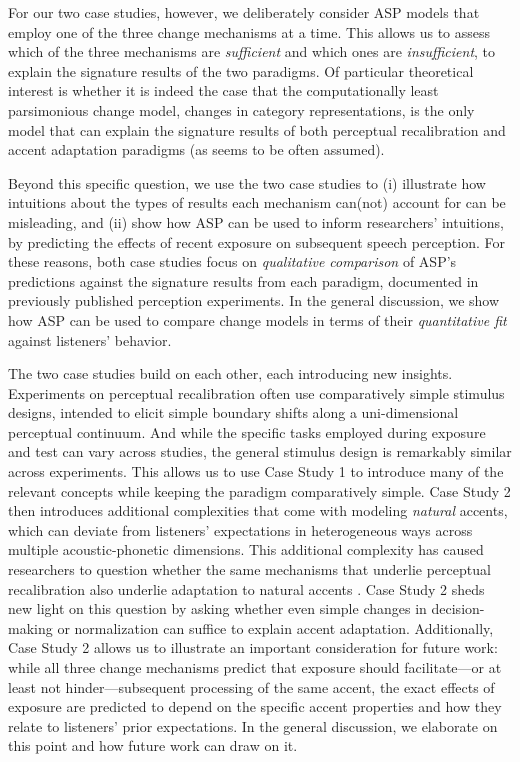 \documentclass[
  11pt,
  man,floatsintext]{apa6}
\begin{document}
For our two case studies, however, we deliberately consider ASP models that employ one of the three change mechanisms at a time. This allows us to assess which of the three mechanisms are \emph{sufficient} and which ones are \emph{insufficient}, to explain the signature results of the two paradigms. Of particular theoretical interest is whether it is indeed the case that the computationally least parsimonious change model, changes in category representations, is the only model that can explain the signature results of both perceptual recalibration and accent adaptation paradigms (as seems to be often assumed).

Beyond this specific question, we use the two case studies to (i) illustrate how intuitions about the types of results each mechanism can(not) account for can be misleading, and (ii) show how ASP can be used to inform researchers' intuitions, by predicting the effects of recent exposure on subsequent speech perception. For these reasons, both case studies focus on \emph{qualitative comparison} of ASP's predictions against the signature results from each paradigm, documented in previously published perception experiments. In the general discussion, we show how ASP can be used to compare change models in terms of their \emph{quantitative fit} against listeners' behavior.

The two case studies build on each other, each introducing new insights. Experiments on perceptual recalibration often use comparatively simple stimulus designs, intended to elicit simple boundary shifts along a uni-dimensional perceptual continuum. And while the specific tasks employed during exposure and test can vary across studies, the general stimulus design is remarkably similar across experiments. This allows us to use Case Study 1 to introduce many of the relevant concepts while keeping the paradigm comparatively simple. Case Study 2 then introduces additional complexities that come with modeling \emph{natural} accents, which can deviate from listeners' expectations in heterogeneous ways across multiple acoustic-phonetic dimensions. This additional complexity has caused researchers to question whether the same mechanisms that underlie perceptual recalibration also underlie adaptation to natural accents \autocites[see recent reviews,][]{baeseberk2018,bent-baeseberk2021,zheng-samuel2020}. Case Study 2 sheds new light on this question by asking whether even simple changes in decision-making or normalization can suffice to explain accent adaptation. Additionally, Case Study 2 allows us to illustrate an important consideration for future work: while all three change mechanisms predict that exposure should facilitate---or at least not hinder---subsequent processing of the same accent, the exact effects of exposure are predicted to depend on the specific accent properties and how they relate to listeners' prior expectations. In the general discussion, we elaborate on this point and how future work can draw on it.
\end{document}

